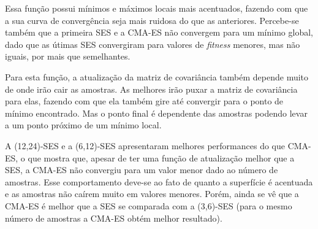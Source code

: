 \documentclass[brazil, 12pt]{article}
\begin{document}
Essa função possui mínimos e máximos locais mais acentuados, fazendo com que a sua curva de convergência seja mais ruidosa do que as anteriores. Percebe-se também que a primeira SES e a CMA-ES não convergem para um mínimo global, dado que as útimas SES convergiram para valores de \textit{fitness} menores, mas não iguais, por mais que semelhantes.

Para esta função, a atualização da matriz de covariância também depende muito de onde irão cair as amostras. As melhores irão puxar a matriz de covariância para elas, fazendo com que ela também gire até convergir para o ponto de mínimo encontrado. Mas o ponto final é dependente das amostras podendo levar a um ponto próximo de um mínimo local.

A (12,24)-SES e a (6,12)-SES apresentaram melhores performances do que CMA-ES, o que mostra que, apesar de ter uma função de atualização melhor que a SES, a CMA-ES não convergiu para um valor menor dado ao número de amostras. Esse comportamento deve-se ao fato de quanto a superfície é acentuada e as amostras não caírem muito em valores menores. Porém, ainda se vê que a CMA-ES é melhor que a SES se comparada com a (3,6)-SES (para o mesmo número de amostras a CMA-ES obtém melhor resultado).
\end{document}
